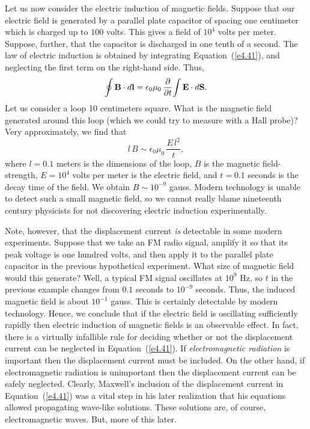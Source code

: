 Let us now consider the electric induction of magnetic fields. Suppose that our
electric field is generated by a parallel plate capacitor of spacing one centimeter
which is charged up 
to $100$ volts. This gives a field of $10^4$ volts per meter. Suppose, 
further, that the capacitor is discharged in one tenth of a second. The law
of electric induction is obtained by integrating Equation~(\ref{e4.41}), and neglecting the
first term on the right-hand side. Thus,
\begin{equation}
\oint {\bf B} \cdot d{\bf l} = \epsilon_0 \mu_0 \,\frac{\partial}{\partial t}\!
\int {\bf E} \cdot d{\bf S}.
\end{equation}
Let us consider a loop 10 centimeters square. What is the magnetic field generated
around this loop (which we could try to  measure with a Hall probe)? Very
approximately, we find that
\begin{equation}
l \,B \sim \epsilon_0 \mu_0 \,\frac{ E\, l^2}{t},
\end{equation}
where $l=0.1$ meters is the dimensions of the loop, $B$ is the 
magnetic field-strength,
$E=10^4$ volts per meter is the electric field, and $t=0.1$ seconds is the decay
time of the field. We obtain $B\sim 10^{-9}$ gauss. Modern technology is
unable to detect such 
a small magnetic field, so we cannot really blame nineteenth century physicists for not
discovering electric induction experimentally.

Note, however, that the displacement current {\em is}\/ detectable in some modern experiments. 
Suppose that we  take an FM radio signal, amplify it so that its peak
voltage is one hundred volts, and then apply it to
the parallel plate capacitor in the previous hypothetical experiment.
 What size of magnetic
field would this generate? Well, a typical FM signal oscillates at $10^9$ Hz,
so $t$ in the previous example changes from $0.1$ seconds to $10^{-9}$ seconds.
Thus, the induced magnetic field is about $10^{-1}$ gauss. This
is certainly detectable by modern technology.  Hence, we conclude that if the electric field is oscillating sufficiently rapidly then electric induction
of magnetic fields is an observable effect. In fact, there is a virtually
infallible rule for deciding whether or not the displacement current can be
neglected in Equation~(\ref{e4.41}). If {\em electromagnetic radiation} is important
then the displacement current must be included. On the other hand, if 
electromagnetic radiation is unimportant then the displacement current can be
safely neglected. Clearly, Maxwell's inclusion of the displacement current in
Equation~(\ref{e4.41}) was a vital step in his later realization that his equations allowed
propagating wave-like solutions. These solutions 
are, of course, electromagnetic waves.
But, more of this later.

